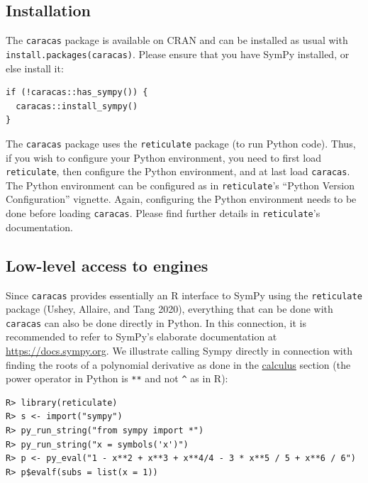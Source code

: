 \hypertarget{installation}{%
\subsection{Installation}\label{installation}}

The \texttt{caracas} package is available on CRAN and can be installed as usual with \texttt{install.packages(\textquotesingle{}caracas\textquotesingle{})}.
Please ensure that you have SymPy installed, or else install it:

\begin{verbatim}
if (!caracas::has_sympy()) {
  caracas::install_sympy()
}
\end{verbatim}

The \texttt{caracas} package uses the \texttt{reticulate} package (to run Python code).
Thus, if you wish to configure your Python environment, you need to
first load \texttt{reticulate}, then configure the Python environment, and at
last load \texttt{caracas}.
The Python environment can be configured as
in \texttt{reticulate}'s ``Python Version Configuration'' vignette.
Again, configuring the Python environment needs to be done before
loading \texttt{caracas}.
Please find further details in \texttt{reticulate}'s documentation.

\hypertarget{low-level-access-to-engines}{%
\subsection{Low-level access to engines}\label{low-level-access-to-engines}}

Since \texttt{caracas} provides essentially an R interface to SymPy using
the \texttt{reticulate} package (Ushey, Allaire, and Tang 2020), everything that can be done
with \texttt{caracas} can also be done directly in Python. In this
connection, it is recommended to refer to SymPy's elaborate
documentation at \url{https://docs.sympy.org}. We illustrate calling Sympy
directly in connection with finding the roots of a polynomial
derivative as done in the \protect\hyperlink{calculus}{calculus} section (the power operator in
Python is \texttt{**} and not \texttt{\^{}} as in R):

\begin{verbatim}
R> library(reticulate)
R> s <- import("sympy") 
R> py_run_string("from sympy import *")
R> py_run_string("x = symbols('x')")
R> p <- py_eval("1 - x**2 + x**3 + x**4/4 - 3 * x**5 / 5 + x**6 / 6")
R> p$evalf(subs = list(x = 1))
\end{verbatim}

